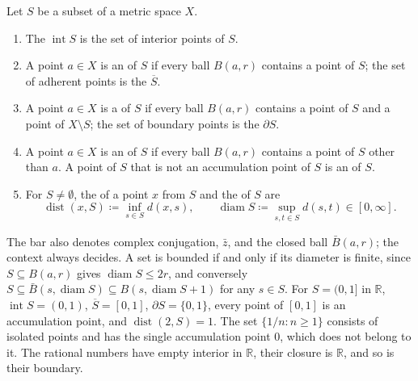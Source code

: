 \begin{definition}
\label{def:closure}
Let $S$ be a subset of a metric space $X$.
\begin{enumerate}
\item The  $\operatorname{int}S$ is the set of interior points of $S$.
\item A point $a\in X$ is an  of $S$ if every ball $B(a,r)$ contains a point of $S$; the set of adherent points is the  $\overline S$.
\item A point $a\in X$ is a  of $S$ if every ball $B(a,r)$ contains a point of $S$ and a point of $X\setminus S$; the set of boundary points is the  $\partial S$.
\item A point $a\in X$ is an  of $S$ if every ball $B(a,r)$ contains a point of $S$ other than $a$. A point of $S$ that is not an accumulation point of $S$ is an  of $S$.
\item For $S\ne\emptyset$, the  of a point $x$ from $S$ and the  of $S$ are
\[
\operatorname{dist}(x,S)\coloneqq\inf_{s\in S}d(x,s),\qquad\operatorname{diam}S\coloneqq\sup_{s,t\in S}d(s,t)\in[0,\infty].
\]
\end{enumerate}
\end{definition}

The bar also denotes complex conjugation, $\bar z$, and the closed ball $\bar B(a,r)$; the context always decides. A set is bounded if and only if its diameter is finite, since $S\subseteq B(a,r)$ gives $\operatorname{diam}S\le2r$, and conversely $S\subseteq\bar B(s,\operatorname{diam}S)\subseteq B(s,\operatorname{diam}S+1)$ for any $s\in S$. For $S=(0,1]$ in $\mathbb R$, $\operatorname{int}S=(0,1)$, $\overline S=[0,1]$, $\partial S=\{0,1\}$, every point of $[0,1]$ is an accumulation point, and $\operatorname{dist}(2,S)=1$. The set $\{1/n: n\ge1\}$ consists of isolated points and has the single accumulation point $0$, which does not belong to it. The rational numbers have empty interior in $\mathbb R$, their closure is $\mathbb R$, and so is their boundary.

